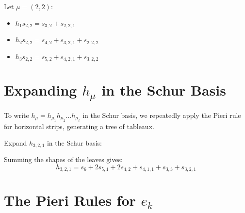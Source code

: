 \documentclass[12pt]{memoir}
\begin{document}
\begin{Ex}
Let $\mu = (2,2)$:
\begin{itemize}
    \item $h_1 s_{2,2} = s_{3,2} + s_{2,2,1}$
    \item $h_2 s_{2,2} = s_{4,2} + s_{3,2,1} + s_{2,2,2}$
    \item $h_3 s_{2,2} = s_{5,2} + s_{4,2,1} + s_{3,2,2}$
\end{itemize}
\end{Ex}

\newpage

\section{Expanding \texorpdfstring{$h_\mu$}{h_{\mu}} in the Schur Basis}

\begin{ptcb}
To write $h_\mu = h_{\mu_1} h_{\mu_2} \dots h_{\mu_\ell}$ in the Schur basis, we repeatedly apply the Pieri rule for horizontal strips, generating a tree of tableaux.
\end{ptcb}

\begin{Ex}
Expand $h_{3,2,1}$ in the Schur basis:
\begin{center}
\end{center}

Summing the shapes of the leaves gives:
\[
h_{3,2,1} = s_6 + 2 s_{5,1} + 2 s_{4,2} + s_{4,1,1} + s_{3,3} + s_{3,2,1}
\]
\end{Ex}

\newpage

\section{The Pieri Rules for \texorpdfstring{$e_k$}{e_k}}
\end{document}
